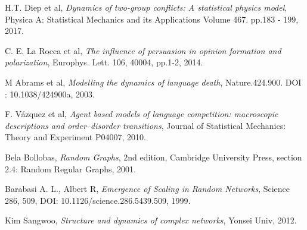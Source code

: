 \documentclass[english]{cccconf}
\begin{document}
\begin{thebibliography}{0}
H.T. Diep et al, \textit{Dynamics of two-group conflicts: A statistical physics model}, Physica A: Statistical Mechanics and its Applications Volume 467. pp.183 - 199, 2017.

C. E. La Rocca et al, \textit{The influence of persuasion in opinion formation and polarization}, Europhys. Lett. 106, 40004, pp.1-2, 2014.

M Abrams et al, \textit{Modelling the dynamics of language death}, Nature.424.900. DOI : 10.1038/424900a, 2003.

 F. V{\'a}zquez et al, \textit{Agent based models of language competition: macroscopic descriptions and order–disorder transitions}, Journal of Statistical Mechanics: Theory and Experiment P04007, 2010.

 Bela Bollobas, \textit{Random Graphs}, 2nd edition, Cambridge University Press, section 2.4: Random Regular Graphs, 2001.

Barabasi A. L., Albert R, \textit{Emergence of Scaling in Random Networks}, Science 286, 509, DOI: 10.1126/science.286.5439.509, 1999.

Kim Sangwoo, \textit{Structure and dynamics of complex networks}, Yonsei Univ, 2012.

\end{thebibliography}
\end{document}
